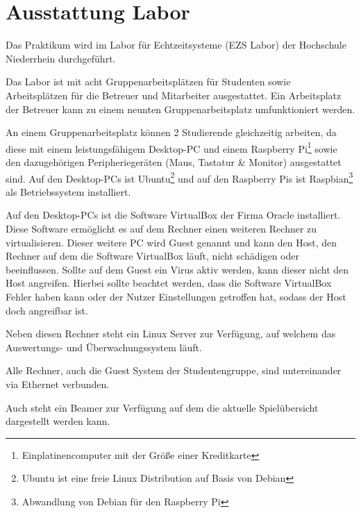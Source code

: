 \section{Ausstattung Labor}
\label{sec:Ausstattung_Labor}

Das Praktikum wird im Labor für Echtzeitsysteme (EZS Labor) der Hochschule Niederrhein durchgeführt.

Das Labor ist mit acht Gruppenarbeitsplätzen für Studenten sowie Arbeitsplätzen für die Betreuer und Mitarbeiter ausgestattet. Ein Arbeitsplatz der Betreuer kann zu einem neunten Gruppenarbeitsplatz umfunktioniert werden.

An einem Gruppenarbeitsplatz können 2 Studierende gleichzeitig arbeiten, da diese mit einem leistungsfähigem Desktop-PC und einem Raspberry Pi\footnote{Einplatinencomputer mit der Größe einer Kreditkarte} sowie den dazugehörigen Peripheriegeräten (Maus, Tastatur \& Monitor) ausgestattet sind.
Auf den Desktop-PCs ist Ubuntu\footnote{Ubuntu ist eine freie Linux Distribution auf Basis von Debian} und auf den Raspberry Pis ist Raspbian\footnote{Abwandlung von Debian für den Raspberry Pi} als Betriebssystem installiert.

Auf den Desktop-PCs ist die Software VirtualBox der Firma Oracle installiert. Diese Software ermöglicht es auf dem Rechner einen weiteren Rechner zu virtualisieren. Dieser weitere PC wird Guest genannt und kann den Host, den Rechner auf dem die Software VirtualBox läuft, nicht schädigen oder beeinflussen. Sollte auf dem Guest ein Virus aktiv werden, kann dieser nicht den Host angreifen. Hierbei sollte beachtet werden, dass die Software VirtualBox Fehler haben kann oder der Nutzer Einstellungen getroffen hat, sodass der Host doch angreifbar ist.

Neben diesen Rechner steht ein Linux Server zur Verfügung, auf welchem das Auswertungs- und Überwachungssystem läuft.

Alle Rechner, auch die Guest System der Studentengruppe, sind untereinander via Ethernet verbunden.

Auch steht ein Beamer zur Verfügung auf dem die aktuelle Spielübersicht dargestellt werden kann.